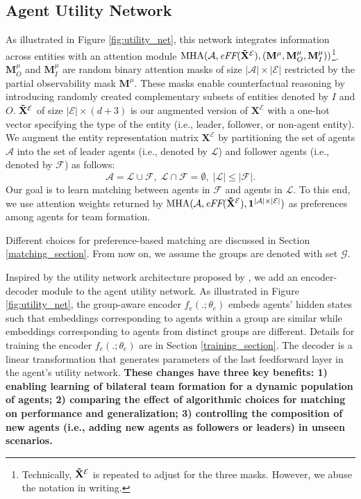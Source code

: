 \documentclass[10pt]{article} %
\begin{document}
\subsection{Agent Utility Network} \label{utility_net}
As illustrated in Figure \ref{fig:utility_net}, this network integrates information across entities with an attention module $\text{MHA}(\mathcal{A},\textit{eFF}(\mathbf{\Tilde{X}}^\mathcal{E}),(\mathbf{M}^{\mu},\mathbf{M}_O^{\mu},\mathbf{M}_I^{\mu}))$\footnote{Technically, $\mathbf{\Tilde{X}}^\mathcal{E}$ is repeated to adjust for the three masks. However, we abuse the notation in writing.}. 
$\mathbf{M}_O^{\mu}$ and $\mathbf{M}_I^{\mu}$ are random binary attention masks of size $|\mathcal{A}| \times |\mathcal{E}|$ restricted by the partial observability mask $\mathbf{M}^{\mu}$. These masks enable counterfactual reasoning by introducing randomly created complementary subsets of entities denoted by $I$ and $O$. $\mathbf{\Tilde{X}}^\mathcal{E}$ of size $|\mathcal{E}| \times (d+3)$ is our augmented version of $\mathbf{X}^\mathcal{E}$ with a one-hot vector specifying the type of the entity (i.e., leader, follower, or non-agent entity). We augment the entity representation matrix $\mathbf{X}^\mathcal{E}$ by partitioning the set of agents $\mathcal{A}$ into the set of leader agents (i.e., denoted by $\mathcal{L}$) and follower agents (i.e., denoted by $\mathcal{F}$) as follows:
\[
\mathcal{A} = \mathcal{L} \cup \mathcal{F}, \; \mathcal{L} \cap \mathcal{F} = \emptyset, \; |\mathcal{L}| \leq |\mathcal{F}|.
\]
Our goal is to learn matching between agents in $\mathcal{F}$ and agents in $\mathcal{L}$. To this end, we use attention weights returned by $\text{MHA}(\mathcal{A}, \textit{eFF}(\mathbf{\Tilde{X}}^\mathcal{E}),\mathbf{1}^{|\mathcal{A}| \times |\mathcal{E}|})$ as preferences among agents for team formation. 

Different choices for preference-based matching are discussed in Section \ref{matching_section}. From now on, we assume the groups are denoted with set $\mathcal{G}$.

Inspired by the utility network architecture proposed by \citet{zang2024automatic}, we add an encoder-decoder module to the agent utility network. As illustrated in Figure \ref{fig:utility_net}, the group-aware encoder $f_e(.;\theta_e)$ embeds agents' hidden states such that embeddings corresponding to agents within a group are similar while embeddings corresponding to agents from distinct groups are different. Details for training the encoder $f_e(.;\theta_e)$ are in Section \ref{training_section}. The decoder is a linear transformation that generates parameters of the last feedforward layer in the agent's utility network.
\textbf{These changes have three key benefits: 1) enabling learning of bilateral team formation for a dynamic population of agents; 2) comparing the effect of algorithmic choices for matching on performance and generalization; 3) controlling the composition of new agents (i.e., adding new agents as followers or leaders) in unseen scenarios.}
\end{document}
